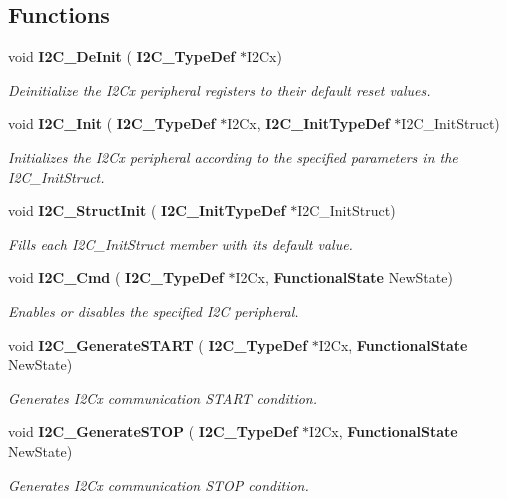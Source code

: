 \subsection*{Functions}
\begin{DoxyCompactItemize}
\item 
void \textbf{ I2\+C\+\_\+\+De\+Init} (\textbf{ I2\+C\+\_\+\+Type\+Def} $\ast$I2\+Cx)
\begin{DoxyCompactList}\small\item\em Deinitialize the I2\+Cx peripheral registers to their default reset values. \end{DoxyCompactList}\item 
void \textbf{ I2\+C\+\_\+\+Init} (\textbf{ I2\+C\+\_\+\+Type\+Def} $\ast$I2\+Cx, \textbf{ I2\+C\+\_\+\+Init\+Type\+Def} $\ast$I2\+C\+\_\+\+Init\+Struct)
\begin{DoxyCompactList}\small\item\em Initializes the I2\+Cx peripheral according to the specified parameters in the I2\+C\+\_\+\+Init\+Struct. \end{DoxyCompactList}\item 
void \textbf{ I2\+C\+\_\+\+Struct\+Init} (\textbf{ I2\+C\+\_\+\+Init\+Type\+Def} $\ast$I2\+C\+\_\+\+Init\+Struct)
\begin{DoxyCompactList}\small\item\em Fills each I2\+C\+\_\+\+Init\+Struct member with its default value. \end{DoxyCompactList}\item 
void \textbf{ I2\+C\+\_\+\+Cmd} (\textbf{ I2\+C\+\_\+\+Type\+Def} $\ast$I2\+Cx, \textbf{ Functional\+State} New\+State)
\begin{DoxyCompactList}\small\item\em Enables or disables the specified I2C peripheral. \end{DoxyCompactList}\item 
void \textbf{ I2\+C\+\_\+\+Generate\+S\+T\+A\+RT} (\textbf{ I2\+C\+\_\+\+Type\+Def} $\ast$I2\+Cx, \textbf{ Functional\+State} New\+State)
\begin{DoxyCompactList}\small\item\em Generates I2\+Cx communication S\+T\+A\+RT condition. \end{DoxyCompactList}\item 
void \textbf{ I2\+C\+\_\+\+Generate\+S\+T\+OP} (\textbf{ I2\+C\+\_\+\+Type\+Def} $\ast$I2\+Cx, \textbf{ Functional\+State} New\+State)
\begin{DoxyCompactList}\small\item\em Generates I2\+Cx communication S\+T\+OP condition. \end{DoxyCompactList}\item 

\end{DoxyCompactItemize}
